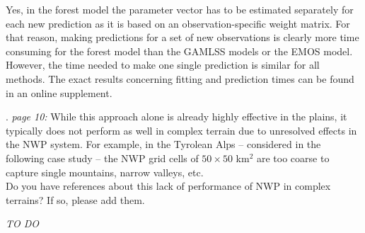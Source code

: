 \documentclass[american,foldmarks=false,noconfig]{uibklttr}
\newenvironment{review}{\fontshape{\itdefault}\fontseries{\bfdefault} \selectfont \smallskip}{\par}
\begin{document}
Yes, in the forest model the parameter vector has to be estimated 
separately for each new prediction as it is based on an 
observation-specific weight matrix. For that reason, making 
predictions for a set of new observations is clearly more 
time consuming for the forest model than the GAMLSS models 
or the EMOS model. However, the time needed to make one single 
prediction is similar for all methods. The exact results 
concerning fitting and prediction times can be found in an online 
supplement.


\begin{review}
11. {\color{quotecolor}\textit{page 10:} While this approach 
alone is already highly effective in the plains, it typically 
does not perform as well in complex terrain due to unresolved 
effects in the NWP system. For example, in the Tyrolean 
Alps -- considered in the following case study -- the NWP grid 
cells of $50 \times 50$ km$^2$ are too coarse to capture single 
mountains, narrow valleys, etc.}\\
Do you have references about this lack of performance of NWP 
in complex terrains? If so, please add them.
\end{review}

\textit{TO DO}
\end{document}
